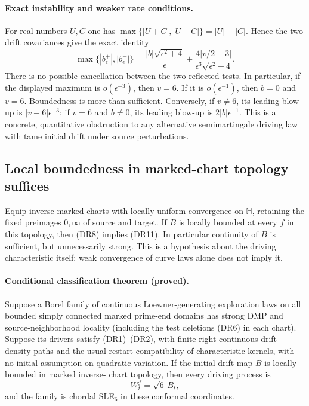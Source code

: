 \documentclass[11pt]{article}
\theoremstyle{definition}\newtheorem{definition}[theorem]{Definition}
\theoremstyle{remark}\newtheorem{remark}[theorem]{Remark}
\begin{document}
\paragraph{Exact instability and weaker rate conditions.}
For real numbers $U,C$ one has
$\max\{|U+C|,|U-C|\}=|U|+|C|$.  Hence the two drift covariances give the
exact identity
\[
 \boxed{\quad
 \max\{|b_\epsilon^+|,|b_\epsilon^-|\}
 =\frac{|b|\sqrt{\epsilon^2+4}}{\epsilon}
  +\frac{4|v/2-3|}{\epsilon^3\sqrt{\epsilon^2+4}}.
 \quad}
 \tag{DR14}
\]
There is no possible cancellation between the two reflected tests.
In particular, if the displayed maximum is $o(\epsilon^{-3})$, then $v=6$.
If it is $o(\epsilon^{-1})$, then $b=0$ and $v=6$.
Boundedness is more than sufficient.  Conversely, if $v\ne6$, its leading
blow-up is $|v-6|\epsilon^{-3}$; if $v=6$ and $b\ne0$, its leading blow-up
is $2|b|\epsilon^{-1}$.  This is a concrete, quantitative obstruction to any
alternative semimartingale driving law with tame initial drift under source
perturbations.

\subsection{Local boundedness in marked-chart topology suffices}

Equip inverse marked charts with locally uniform convergence on
$\mathbb H$, retaining the fixed preimages $0,\infty$ of source and target.
If $B$ is locally bounded at every $f$ in this topology, then (DR8) implies
(DR11).  In particular continuity of $B$ is sufficient, but unnecessarily
strong.  This is a hypothesis about the driving characteristic itself;
weak convergence of curve laws alone does not imply it.

\paragraph{Conditional classification theorem (proved).}
Suppose a Borel family of continuous Loewner-generating exploration laws on
all bounded simply connected marked prime-end domains has strong DMP and
source-neighborhood locality (including the test deletions (DR6) in each
chart).  Suppose its drivers satisfy (DR1)--(DR2), with finite right-continuous
drift-density paths and the usual restart compatibility of characteristic
kernels, with no initial assumption on quadratic variation.  If the initial drift map $B$ is locally bounded in marked inverse-
chart topology, then every driving process is
\[
 W^f_t=\sqrt6\,B_t,
\]
and the family is chordal SLE$_6$ in these conformal coordinates.
\end{document}
